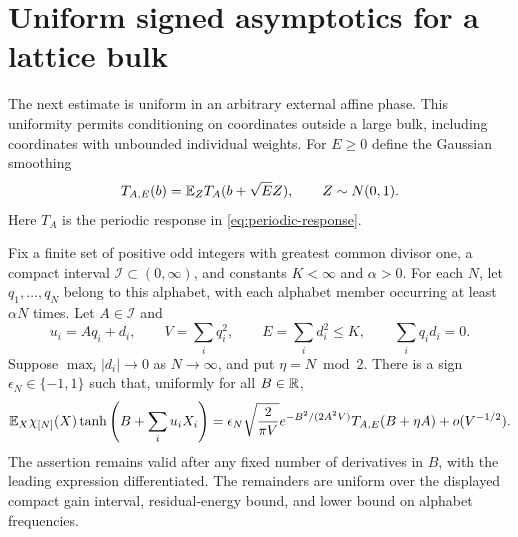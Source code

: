 \section{Uniform signed asymptotics for a lattice bulk}
\label{app:residual-clt}

The next estimate is uniform in an arbitrary external affine phase. This
uniformity permits conditioning on coordinates outside a large bulk,
including coordinates with unbounded individual weights.
For $E\ge0$ define the Gaussian smoothing
\[
 T_{A,E}(b)=\mathbb E_Z T_A(b+\sqrt E Z),\qquad Z\sim N(0,1).
\]
Here $T_A$ is the periodic response in \eqref{eq:periodic-response}.

\begin{theorem}
\label{thm:residual-clt}
Fix a finite set of positive odd integers with greatest common divisor
one, a compact interval $\mathcal I\subset(0,\infty)$, and constants
$K<\infty$ and $\alpha>0$. For each $N$, let $q_1,\ldots,q_N$ belong
to this alphabet, with each alphabet member occurring at least $\alpha N$
times. Let $A\in\mathcal I$ and
\[
 u_i=Aq_i+d_i,\qquad V=\sum_iq_i^2,\qquad E=\sum_i d_i^2\le K,
 \qquad \sum_iq_id_i=0.
\]
Suppose $\max_i|d_i|\to0$ as $N\to\infty$, and put
$\eta=N\bmod2$. There is a sign $\epsilon_N\in\{-1,1\}$ such that,
uniformly for all $B\in\mathbb R$,
\begin{equation}\label{eq:residual-clt}
 \mathbb E_X\chi_{[N]}(X)\tanh\left(B+\sum_i u_iX_i\right)
 =\epsilon_N\sqrt{\frac2{\pi V}}
   e^{-B^2/(2A^2V)}T_{A,E}(B+\eta A)+o(V^{-1/2}).
\end{equation}
The assertion remains valid after any fixed number of derivatives in
$B$, with the leading expression differentiated. The remainders are
uniform over the displayed compact gain interval, residual-energy bound,
and lower bound on alphabet frequencies.
\end{theorem}

